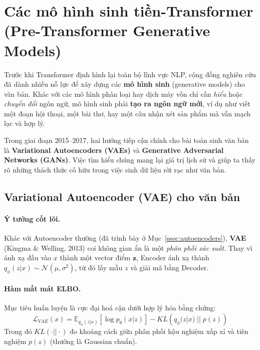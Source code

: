 
\section{Các mô hình sinh tiền-Transformer (Pre-Transformer Generative Models)}
\label{sec:pre_transformer_generative}

Trước khi Transformer định hình lại toàn bộ lĩnh vực NLP, cộng đồng nghiên cứu đã dành nhiều nỗ lực để xây dựng các \textbf{mô hình sinh} (generative models) cho văn bản. Khác với các mô hình phân loại hay dịch máy vốn chỉ cần \textit{hiểu} hoặc \textit{chuyển đổi} ngôn ngữ, mô hình sinh phải \textbf{tạo ra ngôn ngữ mới}, ví dụ như viết một đoạn hội thoại, một bài thơ, hay một câu nhận xét sản phẩm mà vẫn mạch lạc và hợp lý.

Trong giai đoạn 2015–2017, hai hướng tiếp cận chính cho bài toán sinh văn bản là \textbf{Variational Autoencoders (VAEs)} và \textbf{Generative Adversarial Networks (GANs)}. Việc tìm hiểu chúng mang lại giá trị lịch sử và giúp ta thấy rõ những thách thức cố hữu trong việc sinh dữ liệu rời rạc như văn bản.

\subsection{Variational Autoencoder (VAE) cho văn bản}
\label{ssec:vae_for_text}

\paragraph{Ý tưởng cốt lõi.}  
Khác với Autoencoder thường (đã trình bày ở Mục~\ref{ssec:autoencoders}), \textbf{VAE} (Kingma \& Welling, 2013) \cite{kingma2013auto} coi không gian ẩn là một \textit{phân phối xác suất}. Thay vì ánh xạ đầu vào $x$ thành một vector điểm $\mathbf{z}$, Encoder ánh xạ thành $q_\phi(z|x) \sim \mathcal{N}(\mu, \sigma^2)$, từ đó lấy mẫu $z$ và giải mã bằng Decoder.

\paragraph{Hàm mất mát ELBO.}  
Mục tiêu huấn luyện là cực đại hoá cận dưới hợp lý hóa bằng chứng:
\[
\mathcal{L}_{VAE}(x) = \mathbb{E}_{q_\phi(z|x)} \left[ \log p_\theta(x|z) \right] - KL\left(q_\phi(z|x)\;||\;p(z)\right)
\]
Trong đó $KL(\cdot||\cdot)$ đo khoảng cách giữa phân phối hậu nghiệm xấp xỉ và tiên nghiệm $p(z)$ (thường là Gaussian chuẩn).

